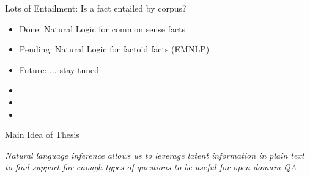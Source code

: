 \begin{frame}{Lots of Entailment: Is a fact entailed by corpus?}
\vspace{2em}

\pause
\begin{itemize}
  \item Done: Natural Logic for common sense facts
  \item Pending: Natural Logic for factoid facts (EMNLP)
  \item Future: $\dots$ stay tuned
\end{itemize}
\vspace{2em}
\pause

\begin{itemize}
  \item {}
  \item {}
  \item {}
\end{itemize}
\end{frame}

\begin{frame}{Main Idea of Thesis}
\begin{center}
\textit{
  Natural language inference allows us to leverage latent information 
  in plain text to find support for enough types of questions to be
  useful for open-domain QA.
}
\end{center}
\end{frame}
